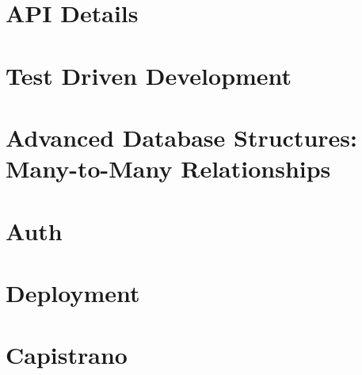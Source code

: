 \documentclass[b5paper,openany]{book}
\begin{document}
\chapter{API Details}


\chapter{Test Driven Development}


\chapter{Advanced Database Structures: Many-to-Many Relationships}


\chapter{Auth}


\chapter{Deployment}


\chapter{Capistrano}







\end{document}
